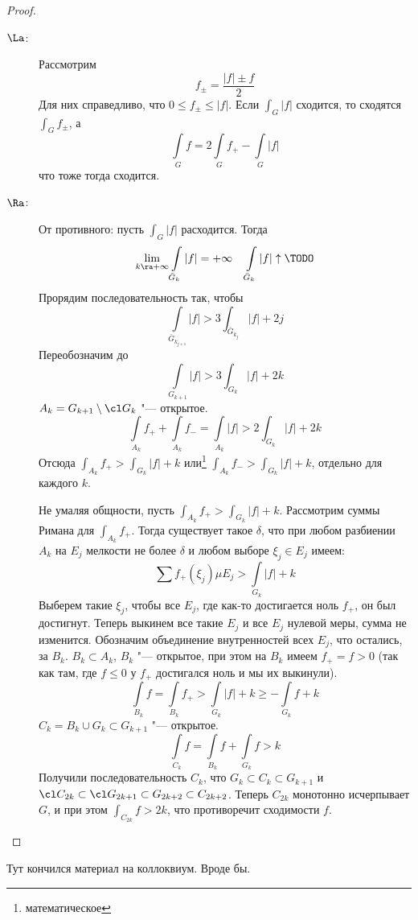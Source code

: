 \begin{proof}
	\begin{description}
	\item[$\La$:]
		Рассмотрим
		\[ f_\pm = \frac{|f| \pm f}2 \]
		Для них справедливо, что $0 \le f_\pm \le |f|$.
		Если $\int_G |f|$ сходится, то сходятся $\int_G f_\pm$, а
		\[ \int\limits_G f = 2\int\limits_G f_+ - \int\limits_G |f|\]
		что тоже тогда сходится.

	\item[$\Ra$:]
		От противного: пусть $\int_G |f|$ расходится.
		Тогда
		\[ \lim_{k \ra +\infty} \int\limits_{\bar G_k} |f| = +\infty \quad \int\limits_{\bar G_k} |f| \uparrow \TODO \]
		Прорядим последовательность так, чтобы
		\[ \int\limits_{\bar G_{k_{j+1}}} |f| > 3 \int_{\bar G_{k_j}} |f| + 2j \]
		Переобозначим до
		\[ \int\limits_{G_{k+1}} |f| > 3 \int_{G_{k}} |f| + 2k \]
		$A_k = G_{k+1} \setminus \cl G_k$ "--- открытое.
		\[ \int\limits_{A_k} f_+ + \int\limits_{A_k} f_- = \int\limits_{A_k} |f| > 2 \int_{G_{k}} |f| + 2k \]
		Отсюда $\int_{A_k} f_+ > \int_{G_{k}} |f| + k$ или\footnote{математическое} $\int_{A_k} f_- > \int_{G_{k}} |f| + k$, отдельно для каждого $k$.

		Не умаляя общности, пусть $\int_{A_k} f_+ > \int_{G_{k}} |f| + k$.
		Рассмотрим суммы Римана для $\int_{A_k} f_+$.
		Тогда существует такое $\delta$, что при любом разбиении $A_k$ на $E_j$ мелкости не более $\delta$ и любом выборе $\xi_j \in E_j$ имеем:
		\[ \sum f_+(\xi_j) \mu E_j > \int\limits_{G_k}|f| + k \]
		Выберем такие $\xi_j$, чтобы все $E_j$, где как-то достигается ноль $f_+$, он был достигнут.
		Теперь выкинем все такие $E_j$ и все $E_j$ нулевой меры, сумма не изменится.
		Обозначим объединение внутренностей всех $E_j$, что остались, за $B_k$.
		$B_k \subset A_k$, $B_k$ "--- открытое, при этом на $B_k$ имеем $f_+ = f > 0$ (так как там, где $f \le 0$ у $f_+$ достигался ноль и мы их выкинули).
		\[ \int\limits_{B_k} f = \int\limits_{B_k} f_+ > \int\limits_{G_k} |f| + k \ge -\int\limits_{G_k} f + k \]
		$C_k = B_k \cup G_k \subset G_{k+1}$ "--- открытое.
		\[ \int\limits_{C_k} f = \int\limits_{B_k} f + \int\limits_{G_k} f > k \]
		Получили последовательность $C_k$, что $G_k \subset C_k \subset G_{k+1}$ и $\cl C_{2k} \subset \cl G_{2k+1} \subset G_{2k+2} \subset C_{2k+2}$.
		Теперь $C_{2k}$ монотонно исчерпывает $G$, и при этом $\int_{C_{2k}} f > 2k$, что противоречит сходимости $f$.
	\end{description}
\end{proof}

\begin{center}
\LARGE
Тут кончился материал на коллоквиум. Вроде бы.
\end{center}

